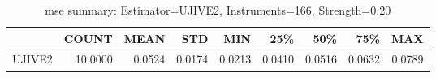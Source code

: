 \begin{table}[ht]
\centering
\caption{mse summary: Estimator=UJIVE2, Instruments=166, Strength=0.20}
\begin{tabular}{lrrrrrrrr}
\toprule
 & COUNT & MEAN & STD & MIN & 25\% & 50\% & 75\% & MAX \\
\midrule
UJIVE2 & 10.0000 & 0.0524 & 0.0174 & 0.0213 & 0.0410 & 0.0516 & 0.0632 & 0.0789 \\
\bottomrule
\end{tabular}
\end{table}
